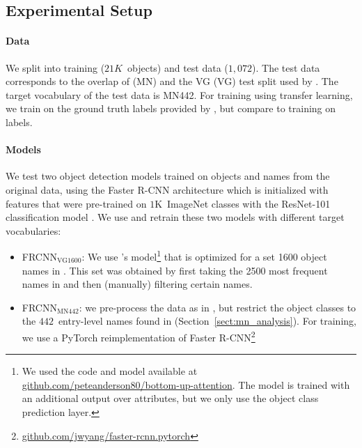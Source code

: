 \subsection{Experimental Setup}
\label{sect:exp_setup}

\paragraph{Data}
We split \mn into training ($21K$~objects) and test data ($1,072$). 
The test data corresponds to the overlap of \mn (MN) and the VG (VG) test split used by  . 
The target vocabulary of the test data is MN442. %
For training using transfer learning, we train on the ground truth labels provided by \mn, but compare to training on \vg labels. 

\paragraph{Models}

We test two object detection models trained on objects and names from the original \vg data, using the Faster R-CNN architecture \cite{fasterrcnn2015} which is initialized with features that were pre-trained on $1$K~ImageNet classes with the ResNet-101 classification model \cite{he2016deep}.
We use and retrain these two models with different target vocabularies:

\begin{small}
\begin{itemize}
\item FRCNN$_{\text{VG1600}}$: We use \citep{anderson2018updown}'s model\footnote{We used the code and model available at  \url{github.com/peteanderson80/bottom-up-attention}. The model is trained with an additional output over attributes, but we only use the object class prediction layer.} that is optimized for a set 1600 object names in \vg. This set was obtained by first taking the 2500 most frequent names in \vg and then (manually) filtering certain names.
 \item  FRCNN$_{\text{MN442}}$: we pre-process the \vg data as in \citeauthor{anderson2018updown}, but restrict the object classes to the $442$~entry-level names found in \mn (Section~\ref{sect:mn_analysis}). 
For training, we use a PyTorch reimplementation of Faster R-CNN\footnote{\url{github.com/jwyang/faster-rcnn.pytorch}}
\end{itemize}
\end{small}


